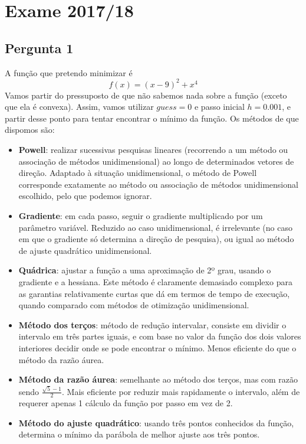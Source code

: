 \setcounter{chapter}{16}
\chapter{Exame 2017/18}
{
\renewcommand{\thesubsection}{\thesection\alph{subsection}}

\section{Pergunta 1}
A função que pretendo minimizar é
\begin{equation*}
    f(x)=(x-9)^2+x^4
\end{equation*}
Vamos partir do pressuposto de que não sabemos nada sobre a função (exceto que ela é convexa). Assim, vamos utilizar $guess=0$ e passo inicial $h=0.001$, e partir desse ponto para tentar encontrar o mínimo da função.
Os métodos de que dispomos são:
\begin{itemize}
    \item \textbf{Powell}: realizar sucessivas pesquisas lineares (recorrendo a um método ou associação de métodos unidimensional) ao longo de determinados vetores de direção. Adaptado à situação unidimensional, o método de Powell corresponde exatamente ao método ou associação de métodos unidimensional escolhido, pelo que podemos ignorar.
    \item \textbf{Gradiente}: em cada passo, seguir o gradiente multiplicado por um parâmetro variável. Reduzido ao caso unidimensional, é irrelevante (no caso em que o gradiente só determina a direção de pesquisa), ou igual ao método de ajuste quadrático unidimensional.
    \item \textbf{Quádrica}: ajustar a função a uma aproximação de 2º grau, usando o gradiente e a hessiana. Este método é claramente demasiado complexo para as garantias relativamente curtas que dá em termos de tempo de execução, quando comparado com métodos de otimização unidimensional.
    \item \textbf{Método dos terços}: método de redução intervalar, consiste em dividir o intervalo em três partes iguais, e com base no valor da função dos dois valores interiores decidir onde se pode encontrar o mínimo. Menos eficiente do que o método da razão áurea.
    \item \textbf{Método da razão áurea}: semelhante ao método dos terços, mas com razão sendo $\frac{\sqrt{5}-1}{2}$. Mais eficiente por reduzir mais rapidamente o intervalo, além de requerer apenas 1 cálculo da função por passo em vez de 2.
    \item \textbf{Método do ajuste quadrático}: usando três pontos conhecidos da função, determina o mínimo da parábola de melhor ajuste aos três pontos.

\end{itemize}}
